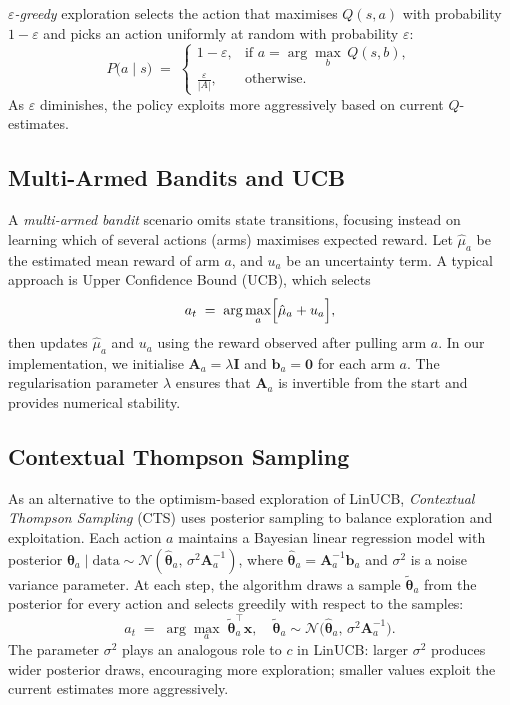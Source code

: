 \emph{$\varepsilon$-greedy} exploration selects the action that maximises $Q(s,a)$ with probability $1-\varepsilon$ and picks an action uniformly at random with probability $\varepsilon$:
\begin{equation}
P\bigl(a \mid s\bigr)
\;=\;
\begin{cases}
1-\varepsilon, & \text{if }a = \displaystyle\arg\max_{b}\,Q(s,b),\\
\displaystyle\frac{\varepsilon}{|A|}, & \text{otherwise}.
\end{cases}
\label{eq:egreedy}
\end{equation}
As $\varepsilon$ diminishes, the policy exploits more aggressively based on current $Q$-estimates.

\subsection{Multi-Armed Bandits and UCB}

A \emph{multi-armed bandit} scenario omits state transitions, focusing instead on learning which of several actions (arms) maximises expected reward. Let $\hat{\mu}_a$ be the estimated mean reward of arm $a$, and $u_a$ be an uncertainty term. A typical approach is Upper Confidence Bound (UCB), which selects
\begin{equation}
a_t
\;=\;
\arg\max_{a}\Bigl[\hat{\mu}_a + u_a\Bigr],
\end{equation}
then updates $\hat{\mu}_a$ and $u_a$ using the reward observed after pulling arm $a$. In our implementation, we initialise $\mathbf{A}_a = \lambda \mathbf{I}$ and $\mathbf{b}_a = \mathbf{0}$ for each arm $a$. The regularisation parameter $\lambda$ ensures that $\mathbf{A}_a$ is invertible from the start and provides numerical stability.

\subsection{Contextual Thompson Sampling}

As an alternative to the optimism-based exploration of LinUCB, \emph{Contextual Thompson Sampling} (CTS) uses posterior sampling to balance exploration and exploitation. Each action $a$ maintains a Bayesian linear regression model with posterior $\boldsymbol{\theta}_a \mid \text{data} \sim \mathcal{N}(\hat{\boldsymbol{\theta}}_a,\, \sigma^2 \mathbf{A}_a^{-1})$, where $\hat{\boldsymbol{\theta}}_a = \mathbf{A}_a^{-1}\mathbf{b}_a$ and $\sigma^2$ is a noise variance parameter. At each step, the algorithm draws a sample $\tilde{\boldsymbol{\theta}}_a$ from the posterior for every action and selects greedily with respect to the samples:
\begin{equation}
a_t \;=\; \arg\max_{a}\; \tilde{\boldsymbol{\theta}}_a^\top \mathbf{x}, \quad \tilde{\boldsymbol{\theta}}_a \sim \mathcal{N}\!\bigl(\hat{\boldsymbol{\theta}}_a,\, \sigma^2 \mathbf{A}_a^{-1}\bigr).
\end{equation}
The parameter $\sigma^2$ plays an analogous role to $c$ in LinUCB: larger $\sigma^2$ produces wider posterior draws, encouraging more exploration; smaller values exploit the current estimates more aggressively.

